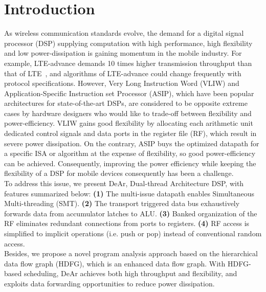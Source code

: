 \section{Introduction}%
As wireless communication standards evolve, the demand for a digital signal processor (DSP) supplying computation with high performance, high flexibility and low power-dissipation is gaining momentum in the mobile industry. 
For example, LTE-advance demands 10 times higher transmission throughput than that of LTE~\cite{lte}, 
and algorithms of LTE-advance could change frequently with protocol specifications.
However, Very Long Instruction Word (VLIW) and Application-Specific Instruction set Processor (ASIP), which have been popular architectures for state-of-the-art DSPs, are considered to be opposite extreme cases by hardware designers who would like to trade-off between flexibility and power-efficiency. 
VLIW gains good flexibility by allocating each arithmetic unit dedicated control signals and data ports in the register file (RF), which result in severe power dissipation. %
On the contrary, ASIP buys the optimized datapath for a specific ISA or algorithm at the expense of flexibility, so good power-efficiency can be achieved. 
Consequently, improving the power efficiency while keeping the flexibility of a DSP for mobile devices consequently has been a challenge.	
\\\indent
To address this issue, 
we present DeAr, Dual-thread Architecture DSP, with features summarized below: 
\textbf{(1)} The multi-issue datapath enables Simultaneous Multi-threading (SMT).
\textbf{(2)} The transport triggered data bus exhaustively forwards data from accumulator latches to ALU.
\textbf{(3)} Banked organization of the RF eliminates redundant connections from ports to registers.
\textbf{(4)} RF access is simplified to implicit operations (i.e. push or pop) instead of conventional random access.
\\\indent
Besides, we propose a novel program analysis approach based on the hierarchical data flow graph (HDFG), which is an enhanced data flow graph.
With HDFG-based scheduling, DeAr achieves both high throughput and flexibility, 
and exploits data forwarding opportunities to reduce power dissipation.
